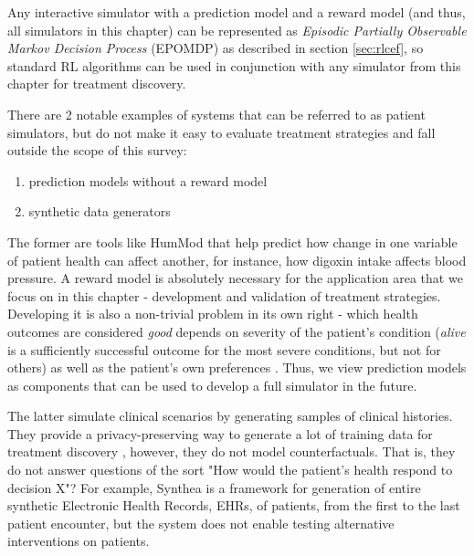 Any interactive simulator with a prediction model and a reward model (and thus, all simulators in this chapter) can be represented as {\em Episodic Partially Observable Markov Decision Process} (EPOMDP) as described in section \ref{sec:rlcef}, so standard RL algorithms can be used in conjunction with any simulator from this chapter for treatment discovery.

There are 2 notable examples of systems that can be referred to as patient simulators, but do not make it easy to evaluate treatment strategies and fall outside the scope of this survey:
\begin{enumerate}
    \item prediction models without a reward model
    \item synthetic data generators \cite{chenSyntheticDataMachine2021}
\end{enumerate}

The former are tools like HumMod \cite{hesterHumModModelingEnvironment2011} that help predict how change in one variable of patient health can affect another, for instance, how digoxin intake affects blood pressure.
A reward model is absolutely necessary for the application area that we focus on in this chapter - development and validation of treatment strategies.
Developing it is also a non-trivial problem in its own right - which health outcomes are considered \emph{good} depends on severity of the patient's condition (\emph{alive} is a sufficiently successful outcome for the most severe conditions, but not for others) as well as the patient's own preferences \cite{streetPatientPreferencesHealthcare2012,muhlbacherPatientPreferencesPhysicians2013}.
Thus, we view prediction models as components that can be used to develop a full simulator in the future.

The latter simulate clinical scenarios by generating samples of clinical histories.
They provide a privacy-preserving way to generate a lot of training data for treatment discovery \cite{gongSurveyDifferentiallyPrivate2020,wangGeneratingEvaluatingCrosssectional2021,jordonPATEGANGeneratingSynthetic2018,rankinReliabilitySupervisedMachine2020}, however, they do not model counterfactuals. That is, they do not answer questions of the sort "How would the patient's health respond to decision X"? For example, Synthea \cite{walonoskiSyntheaApproachMethod2017} is a framework for generation of entire synthetic Electronic Health Records, EHRs, of patients, from the first to the last patient encounter, but the system does not enable testing alternative interventions on patients.

